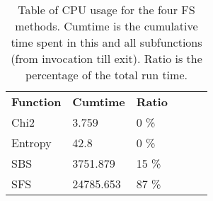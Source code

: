 \begin{table}[htbp]
\begin{center}
\begin{tabular}{|l|l|l|l|l|l|}
\cline{1-3}
\textbf{Function} & \textbf{Cumtime} & \textbf{Ratio}  \\
\cline{1-3}
          Chi2 &   3.759  &   0 \% \\
          Entropy &   42.8  &  0 \% \\
          SBS &   3751.879  &  15 \% \\
          SFS &   24785.653  & 87 \% \\

\cline{1-3}
\end{tabular}
\caption[]
{\small
  Table of CPU usage for the four FS methods. Cumtime is the cumulative time spent in this and all subfunctions (from invocation till exit). Ratio is the percentage of the total run time.
}
\label{table:cpu}
\end{center}
\end{table}




%
%
%
